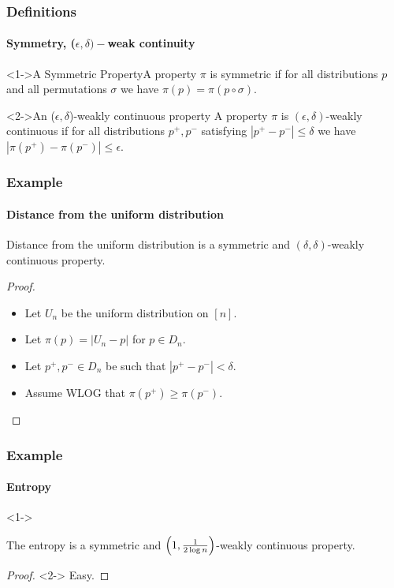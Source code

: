 \documentclass[handout]{beamer}
\begin{document}
\begin{frame}
  \frametitle{Definitions}
  \framesubtitle{Symmetry, ($\epsilon,\delta)-$weak continuity}

  \begin{block}<1->{A Symmetric Property}A property $\pi$ is symmetric if
    for all distributions $p$ and all permutations $\sigma$ we have
    $\pi(p)=\pi(p\circ\sigma)$.
  \end{block}

  \begin{block}<2->{An ($\epsilon, \delta$)-weakly continuous property}
    A property $\pi$ is $(\epsilon,\delta)$-weakly continuous if for
    all distributions $p^+,p^-$ satisfying $|p^+-p^-|\le\delta$ we
    have $|\pi(p^+)-\pi(p^-)|\le \epsilon$.
  \end{block}
\end{frame}

\begin{frame}
  \frametitle{Example} \framesubtitle{Distance from the uniform
    distribution}
  \begin{theorem}
    Distance from the uniform distribution is a symmetric and
    $(\delta, \delta)$-weakly continuous property.
  \end{theorem}
  \begin{proof}
    \begin{itemize}
    \item<1-> Let $U_n$ be the uniform distribution on $[n]$.
    \item<2-> Let $\pi(p)=|U_n-p|$ for $p\in D_n$.
    \item<3-> Let $p^+,p^-\in D_n$ be such that $|p^+-p^-|<\delta$.
    \item<4-> Assume WLOG that $\pi(p^+) \geq \pi(p^-)$.
    \end{itemize}
  \end{proof}
\end{frame}

\begin{frame}
  \frametitle{Example} \framesubtitle{Entropy}
  \begin{theorem}<1->

    The entropy is a symmetric and $\left(1,{1\over 2\log
        n}\right)$-weakly continuous property.
  \end{theorem}
  \begin{proof}<2->
    Easy.
  \end{proof}
\end{frame}
\end{document}
